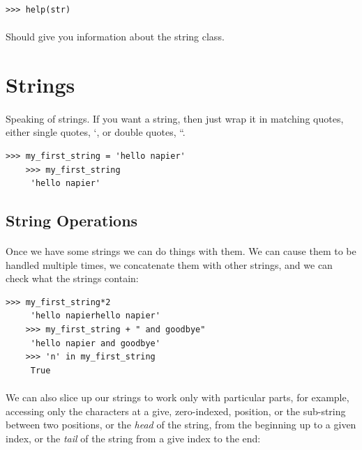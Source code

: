 \documentclass[12pt, a4paper, oneside]{book}
\begin{document}
{\begin{lstlisting}[style=DOS]
    >>> help(str)
\end{lstlisting}

\paragraph{} Should give you information about the string class.

\section{Strings}
\label{strings}

\paragraph{} Speaking of strings. If you want a string, then just wrap it in matching quotes, either single quotes, `, or double quotes, ``.

\begin{lstlisting}[style=DOS]
    >>> my_first_string = 'hello napier'
    >>> my_first_string
     'hello napier'
\end{lstlisting}

\subsection{String Operations}
\paragraph{} Once we have some strings we can do things with them. We can cause them to be handled multiple times, we concatenate them with other strings, and we can check what the strings contain:

\begin{lstlisting}[style=DOS]
    >>> my_first_string*2
     'hello napierhello napier'
    >>> my_first_string + " and goodbye"
     'hello napier and goodbye'
    >>> 'n' in my_first_string
     True
\end{lstlisting}

\paragraph{} We can also slice up our strings to work only with particular parts, for example, accessing only the characters at a give, zero-indexed, position, or the sub-string between two positions, or the \emph{head} of the string, from the beginning up to a given index, or the \emph{tail} of the string from a give index to the end:

}
\end{document}
